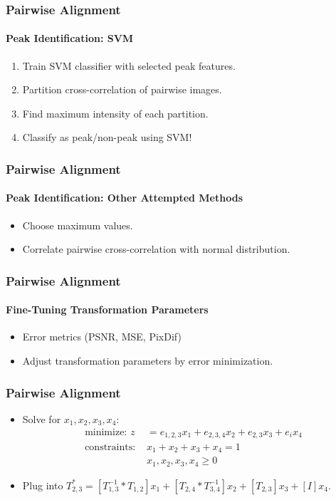 \documentclass{beamer}
\begin{document}
\begin{frame}
\frametitle{Pairwise Alignment}
\framesubtitle{Peak Identification: SVM} 
\begin{enumerate}
\item Train SVM classifier with selected peak features. 
\item Partition cross-correlation of pairwise images. 
\item Find maximum intensity of each partition. 
\item Classify as peak/non-peak using SVM! 
\end{enumerate}
\end{frame}

\begin{frame}
\frametitle{Pairwise Alignment}
\framesubtitle{Peak Identification: Other Attempted Methods} 
\begin{itemize}
\item Choose maximum values.
\item Correlate pairwise cross-correlation with normal distribution. 
\end{itemize}
\end{frame}

\begin{frame}
\frametitle{Pairwise Alignment}
\framesubtitle{Fine-Tuning Transformation Parameters} 
\begin{itemize}
\item Error metrics (PSNR, MSE, PixDif)
\item Adjust transformation parameters by error minimization.
\end{itemize}
\end{frame}

\begin{frame}
\frametitle{Pairwise Alignment}
\begin{itemize}
\item Solve for $x_1, x_2, x_3, x_4:$
	\begin{align*}
	 \text{minimize: } z &= e_{1,2,3}x_1 +  e_{2,3,4}x_2 + e_{2,3}x_3 + e_ix_4\\
	 \text{constraints: }&x_1 + x_2 + x_3 + x_4 = 1\\
	 &x_1, x_2, x_3, x_4 \ge 0
	\end{align*}
\item Plug into $T_{2,3}^{*} = [T_{1,3}^{-1}*T_{1,2}]x_1 + [T_{2,4}*T_{3,4}^{-1}]x_2 + [T_{2,3}]x_3 + [I]x_4.$
\end{itemize}
\end{frame}
\end{document}
